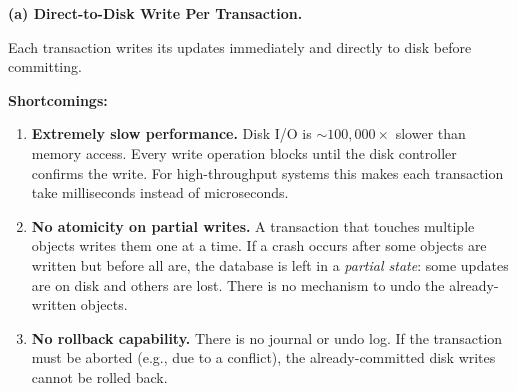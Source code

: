 \documentclass[12pt,a4paper]{article}
\begin{document}
\begin{solbox}
\textbf{(a) Direct-to-Disk Write Per Transaction.}

Each transaction writes its updates immediately and directly to disk before committing.

\textbf{Shortcomings:}
\begin{enumerate}
  \item \textbf{Extremely slow performance.}
        Disk I/O is $\sim\!100{,}000\times$ slower than memory access.
        Every write operation blocks until the disk controller confirms the write.
        For high-throughput systems this makes each transaction take milliseconds instead
        of microseconds.

  \item \textbf{No atomicity on partial writes.}
        A transaction that touches multiple objects writes them one at a time.
        If a crash occurs after some objects are written but before all are, the database
        is left in a \emph{partial state}: some updates are on disk and others are lost.
        There is no mechanism to undo the already-written objects.

  \item \textbf{No rollback capability.}
        There is no journal or undo log. If the transaction must be aborted (e.g., due to
        a conflict), the already-committed disk writes cannot be rolled back.
\end{enumerate}
\end{solbox}
\end{document}
